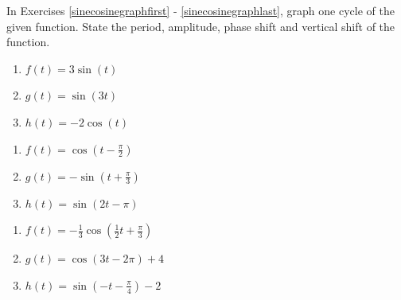 \documentclass{ximera}
\begin{document}
	\author{Stitz-Zeager}


In Exercises \ref{sinecosinegraphfirst} - \ref{sinecosinegraphlast}, graph one cycle of the given function.  State the period, amplitude, phase shift and vertical shift of the function.

\begin{multicols}{3}

\begin{enumerate}

\item $f(t) = 3\sin(t)$ \label{sinecosinegraphfirst}
\item $g(t) = \sin(3t)$
\item $h(t)  = -2\cos(t)$

\setcounter{HW}{\value{enumi}}

\end{enumerate}

\end{multicols}

\begin{multicols}{3}

\begin{enumerate}

\setcounter{enumi}{\value{HW}}

\item $f(t)  = \cos \left( t - \frac{\pi}{2} \right)$
\item $g(t)  = -\sin \left( t + \frac{\pi}{3} \right)$
\item $h(t) = \sin(2t - \pi)$ 

\setcounter{HW}{\value{enumi}}

\end{enumerate}

\end{multicols}

\begin{multicols}{3}

\begin{enumerate}

\setcounter{enumi}{\value{HW}}

\item $f(t)  = -\frac{1}{3}\cos \left( \frac{1}{2}t + \frac{\pi}{3} \right)$
\item $g(t) = \cos (3t - 2\pi) + 4$ 
\item $h(t)  = \sin \left( -t - \frac{\pi}{4} \right) - 2$ 

\setcounter{HW}{\value{enumi}}

\end{enumerate}

\end{multicols}
\end{document}
